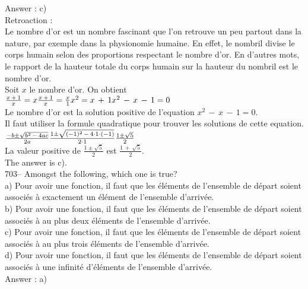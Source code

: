 ﻿\documentclass[letterpaper, 12pt]{article}
\begin{document}
Answer : c)\\

Retroaction : \\
Le nombre d'or est un nombre fascinant que l'on retrouve un peu partout dans
la nature, par exemple dans la physionomie humaine. En effet, le nombril
divise le corps humain selon des proportions respectant le nombre d'or.  En
d'autres mots, le rapport de la hauteur totale du corps humain sur la
hauteur du nombril est le nombre d'or.\\
Soit $x$ le nombre d'or.  On obtient\\[2mm]
$\frac{x\,+\,1}{x}=x\\[2mm]
\frac{x\,+\,1}{x}=\frac{x}{1}\\[2mm]
x^{2}=x\,+\,1\\[2mm]
x^{2}\,-\,x\,-\,1=0$\\[2mm]
Le nombre d'or est la solution positive de l'equation
$x^{2}\,-\,x\,-\,1=0$.\\
Il faut utiliser la formule quadratique pour trouver les solutions de cette
equation.\\[2mm]
$\frac{-b\pm\sqrt{b^{2}\,-\,4ac}}{2a}\\[2mm]
\frac{1\pm\sqrt{(-1)^{2}\,-\,4\cdot1\cdot(-1)}}{2\cdot1}\\[2mm]
\frac{1\pm\sqrt{5}}{2}$\\[2mm]
La valeur positive de $\frac{1\pm\sqrt{5}}{2}$ est
$\frac{1\,+\,\sqrt{5}}{2}$.\\[2mm]
The answer is c).\\


703-- Amongst the following, which one is true?\\
a) Pour avoir une fonction, il faut que les \'el\'ements de
l'ensemble de d\'epart soient associ\'es \`a exactement un
\'el\'ement de l'ensemble
d'arriv\'ee.\\
b) Pour avoir une fonction, il faut que les \'el\'ements de l'ensemble de
d\'epart soient associ\'es \`a au plus deux \'el\'ements de l'ensemble
d'arriv\'ee.\\
c) Pour avoir une fonction, il faut que les \'el\'ements de l'ensemble de
d\'epart soient associ\'es \`a au plus trois \'el\'ements de l'ensemble
d'arriv\'ee.\\
d) Pour avoir une fonction, il faut que les \'el\'ements de l'ensemble de
d\'epart soient associ\'es \`a une infinit\'e d'\'el\'ements de l'ensemble
d'arriv\'ee.\\

Answer : a)\\
\end{document}
